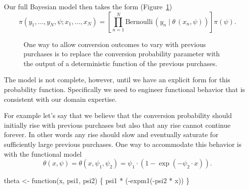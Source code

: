 \documentclass[
  letterpaper,
  DIV=11,
  numbers=noendperiod]{scrartcl}
\newenvironment{Shaded}{\begin{snugshade}}{\end{snugshade}}
\newcommand{\ControlFlowTok}[1]{\textcolor[rgb]{0.00,0.23,0.31}{#1}}
\newcommand{\FunctionTok}[1]{\textcolor[rgb]{0.28,0.35,0.67}{#1}}
\newcommand{\NormalTok}[1]{\textcolor[rgb]{0.00,0.23,0.31}{#1}}
\newcommand{\OtherTok}[1]{\textcolor[rgb]{0.00,0.23,0.31}{#1}}
\newcommand{\SpecialCharTok}[1]{\textcolor[rgb]{0.37,0.37,0.37}{#1}}
\begin{document}
Our full Bayesian model then takes the form (Figure~\ref{fig-model2}) \[
\pi(y_{1}, \ldots, y_{N}, \psi; x_{1}, \ldots, x_{N})
=
\left[
\prod_{n = 1}^{N} \text{Bernoulli} \,(y_{n} \mid \theta \, (x_{n}, \psi))
\right]
\pi(\psi).
\]

\begin{figure}


\caption{\label{fig-model2}One way to allow conversion outcomes to vary
with previous purchases is to replace the conversion probability
parameter with the output of a deterministic function of the previous
purchases.}

\end{figure}%

The model is not complete, however, until we have an explicit form for
this probability function. Specifically we need to engineer functional
behavior that is consistent with our domain expertise.

For example let's say that we believe that the conversion probability
should initially rise with previous purchases but also that any rise
cannot continue forever. In other words any rise should slow and
eventually saturate for sufficiently large previous purchases. One way
to accommodate this behavior is with the functional model \[
\theta(x, \psi)
= \theta(x, \psi_{1}, \psi_{2})
= \psi_{1} \cdot \left( 1 - \exp(- \psi_{2} \cdot x) \right).
\]

\begin{Shaded}
\begin{Highlighting}[]
\NormalTok{theta }\OtherTok{\textless{}{-}} \ControlFlowTok{function}\NormalTok{(x, psi1, psi2) \{}
\NormalTok{  psi1 }\SpecialCharTok{*}\NormalTok{ (}\SpecialCharTok{{-}}\FunctionTok{expm1}\NormalTok{(}\SpecialCharTok{{-}}\NormalTok{psi2 }\SpecialCharTok{*}\NormalTok{ x))}
\NormalTok{\}}
\end{Highlighting}
\end{Shaded}
\end{document}
